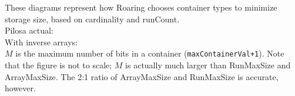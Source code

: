 \documentclass{article}
\begin{document}

These diagrams represent how Roaring chooses container types to minimize storage
size, based on cardinality and runCount.\\

Pilosa actual:\\


With inverse arrays:\\



$M$ is the maximum number of bits in a container (\texttt{maxContainerVal+1}).
Note that the figure is not to scale; $M$ is actually much larger than
RunMaxSize and ArrayMaxSize. The 2:1 ratio of ArrayMaxSize and RunMaxSize is
accurate, however.\\
\end{document}
